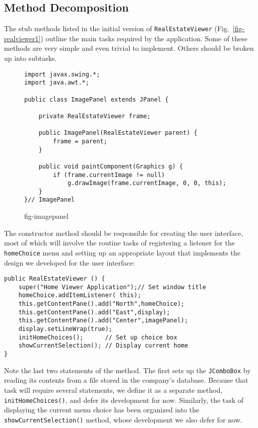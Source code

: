 {\subsection*{Method Decomposition}
\noindent The stub methods listed in the initial version of
{\tt RealEstateViewer} (Fig.~\ref{fig-realviewer1}) outline the main
tasks required by the application.  Some of these methods are very
simple and even trivial to implement.  Others should be broken up into
subtasks.


\begin{figure}[tb]
\jjjprogstart
\begin{jjjlisting}
\begin{lstlisting}
import javax.swing.*;
import java.awt.*;

public class ImagePanel extends JPanel {

    private RealEstateViewer frame;

    public ImagePanel(RealEstateViewer parent) {
        frame = parent;
    }

    public void paintComponent(Graphics g) {
        if (frame.currentImage != null)
            g.drawImage(frame.currentImage, 0, 0, this);
    }
}// ImagePanel
\end{lstlisting}
\end{jjjlisting}
{fig-imagepanel}
\end{figure}

The constructor method should be responsible for creating the user
interface, most of which will involve the routine tasks of registering
a listener for the {\tt homeChoice} menu and setting up an appropriate
layout that implements the design we developed for the user interface:

\begin{jjjlisting}
\begin{lstlisting}
public RealEstateViewer () {
    super("Home Viewer Application");// Set window title
    homeChoice.addItemListener( this);
    this.getContentPane().add("North",homeChoice);
    this.getContentPane().add("East",display);
    this.getContentPane().add("Center",imagePanel);
    display.setLineWrap(true);
    initHomeChoices();      // Set up choice box
    showCurrentSelection(); // Display current home
}
\end{lstlisting}
\end{jjjlisting}

\noindent Note the last two statements of the method.
The first sets up the {\tt JComboBox} by reading its contents from a file
stored in the company's database.  Because that task will require
several statements, we define it as a separate method,
{\tt initHomeChoices()}, and defer its development for now.  Similarly,
the task of displaying the current menu choice has been organized
into the {\tt showCurrentSelection()} method, whose development
we also defer for now.

}
